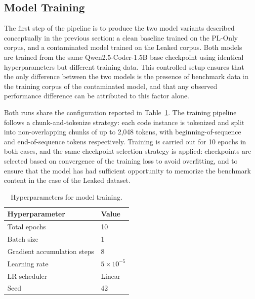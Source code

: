 \documentclass[mscthesis]{usiinfthesis}
\begin{document}
\subsection{Model Training} 
The first step of the pipeline is to produce the two model variants described conceptually in
the previous section: a clean baseline trained on the PL-Only corpus, and a contaminated model
trained on the Leaked corpus. Both models are trained from the same Qwen2.5-Coder-1.5B
base checkpoint using identical hyperparameters but different training data.
This controlled setup ensures that the only difference between the two models is the presence of benchmark data in the training corpus of the contaminated model, and that any observed performance difference can be attributed to this factor alone. 
\par\vspace{1em} 
Both runs share the configuration reported in Table~\ref{tab:hyperparams}. 
The training pipeline follows a chunk-and-tokenize strategy: each code instance is tokenized and split
into non-overlapping chunks of up to 2,048 tokens, with beginning-of-sequence and
end-of-sequence tokens respectively. 
Training is carried out for 10 epochs in both cases, and the same checkpoint selection strategy is applied: 
checkpoints are selected based on convergence of the training loss to avoid overfitting, and to ensure that the model has had sufficient opportunity to memorize the benchmark content in the case of the Leaked dataset.

\begin{table}[h]
\centering
\caption{Hyperparameters for model training.}
\label{tab:hyperparams}
\begin{tabular}{ll}
\hline
\textbf{Hyperparameter} & \textbf{Value} \\
\hline
Total epochs                  & 10 \\
Batch size                    & 1 \\
Gradient accumulation steps   & 8 \\
Learning rate                 & $5 \times 10^{-5}$ \\
LR scheduler                  & Linear \\
Seed                          & 42 \\
\hline
\end{tabular}
\end{table}
 
\end{document}
